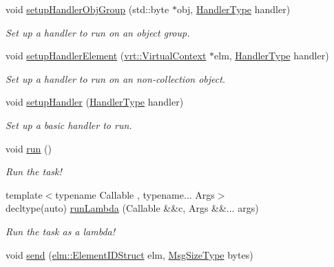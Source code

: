 \begin{DoxyCompactItemize}
void \hyperlink{structvt_1_1runnable_1_1_runnable_new_abdb77505f39b813b866d4bb3af0be38f}{setup\+Handler\+Obj\+Group} (std\+::byte $\ast$obj, \hyperlink{namespacevt_af64846b57dfcaf104da3ef6967917573}{Handler\+Type} handler)
\begin{DoxyCompactList}\small\item\em Set up a handler to run on an object group. \end{DoxyCompactList}\item 
void \hyperlink{structvt_1_1runnable_1_1_runnable_new_aeaec7cf81fe97f2d6b57f35dbd408b5e}{setup\+Handler\+Element} (\hyperlink{structvt_1_1vrt_1_1_virtual_context}{vrt\+::\+Virtual\+Context} $\ast$elm, \hyperlink{namespacevt_af64846b57dfcaf104da3ef6967917573}{Handler\+Type} handler)
\begin{DoxyCompactList}\small\item\em Set up a handler to run on an non-\/collection object. \end{DoxyCompactList}\item 
void \hyperlink{structvt_1_1runnable_1_1_runnable_new_ab95b9552fe304366b21421ded2b795dc}{setup\+Handler} (\hyperlink{namespacevt_af64846b57dfcaf104da3ef6967917573}{Handler\+Type} handler)
\begin{DoxyCompactList}\small\item\em Set up a basic handler to run. \end{DoxyCompactList}\item 
void \hyperlink{structvt_1_1runnable_1_1_runnable_new_a3fa6c8ee2214c074c748000f782ad793}{run} ()
\begin{DoxyCompactList}\small\item\em Run the task! \end{DoxyCompactList}\item 
{\footnotesize template$<$typename Callable , typename... Args$>$ }\\decltype(auto) \hyperlink{structvt_1_1runnable_1_1_runnable_new_a9bc943e7d924be528d2a0c02af3850c8}{run\+Lambda} (Callable \&\&c, Args \&\&... args)
\begin{DoxyCompactList}\small\item\em Run the task as a lambda! \end{DoxyCompactList}\item 
void \hyperlink{structvt_1_1runnable_1_1_runnable_new_aa7e06ec59e7376d1d01dfa6ab9a9563b}{send} (\hyperlink{structvt_1_1elm_1_1_element_i_d_struct}{elm\+::\+Element\+I\+D\+Struct} elm, \hyperlink{namespacevt_a408e86a8c7c89309b52907dc5a513924}{Msg\+Size\+Type} bytes)

\end{DoxyCompactItemize}
